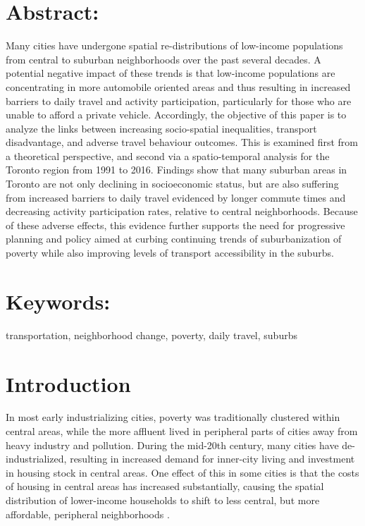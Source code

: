 

\section*{{Abstract:}}


	Many cities have undergone spatial re-distributions of low-income populations from central to suburban neighborhoods over the past several decades. A potential negative impact of these trends is that low-income populations are concentrating in more automobile oriented areas and thus resulting in increased barriers to daily travel and activity participation, particularly for those who are unable to afford a private vehicle. Accordingly, the objective of this paper is to analyze the links between increasing socio-spatial inequalities, transport disadvantage, and adverse travel behaviour outcomes. This is examined first from a theoretical perspective, and second via a spatio-temporal analysis for the Toronto region from 1991 to 2016. Findings show that many suburban areas in Toronto are not only declining in socioeconomic status, but are also suffering from increased barriers to daily travel evidenced by longer commute times and decreasing activity participation rates, relative to central neighborhoods. Because of these adverse effects, this evidence further supports the need for progressive planning and policy aimed at curbing continuing trends of suburbanization of poverty while also improving levels of transport accessibility in the suburbs.



\section*{{Keywords:}}

transportation, neighborhood change, poverty, daily travel, suburbs








\normalsize




\section{Introduction}

In most early industrializing cities, poverty was traditionally clustered within central areas, while the more affluent lived in peripheral parts of cities away from heavy industry and pollution. During the mid-20th century, many cities have de-industrialized, resulting in increased demand for inner-city living and investment in housing stock in central areas. One effect of this in some cities is that the costs of housing in central areas has increased substantially, causing the spatial distribution of lower-income households to shift to less central, but more affordable, peripheral neighborhoods . 

